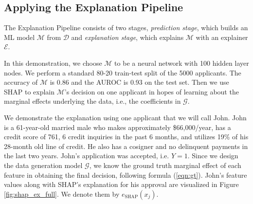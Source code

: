 \documentclass[mnsc,blindrev]{informs3}
\begin{document}
\subsection{Applying the Explanation Pipeline}
\label{sec:applying_to_simulated}
The Explanation Pipeline consists of two stages, \emph{prediction stage}, which builds an ML model $\mathcal{M}$ from $\mathcal{D}$ and \emph{explanation stage}, which explains $\mathcal{M}$ with an explainer $\mathcal{E}$.

In this demonstration, we choose $\mathcal{M}$ to be a neural network with 100 hidden layer nodes. We perform a standard 80-20 train-test split of the 5000 applicants. The accuracy of $\mathcal{M}$ is 0.86 and the AUROC is 0.93 on the test set. %
Then we use SHAP to explain $\mathcal{M}$'s decision on one applicant in hopes of learning about the marginal effects underlying the data, i.e., the coefficients in $\mathcal{G}$.%

We demonstrate the explanation using one applicant that we will call John. John is a 61-year-old married male who makes approximately \$66,000/year, has a credit score of 761, 6 credit inquiries in the past 6 months, and utilizes 19\% of his 28-month old line of credit. He also has a cosigner and no delinquent payments in the last two years. John's application was accepted, i.e. $Y = 1$. Since we design the data generation model $\mathcal{G}$, we know the ground truth marginal effect of each feature in obtaining the final decision, following formula (\ref{eqn:gt}). John's feature values along with SHAP's explanation for his approval are visualized in Figure \ref{fig:shap_ex_full}. We denote them by $e_\text{SHAP}(x_j)$. %
\end{document}
